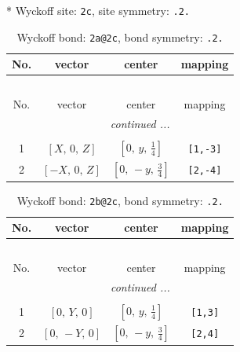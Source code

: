 \documentclass[fleqn,8pt]{jsarticle}
\begin{document}
* Wyckoff site: {\tt 2c}, site symmetry: {\tt .2.}
\renewcommand{\arraystretch}{1.2}
\begin{longtable}{cccc}
\caption{Wyckoff bond: {\tt 2a@2c}, bond symmetry: {\tt .2.}}
 \\
 \hline \hline
No. & vector & center & mapping \\ \hline \endfirsthead

\multicolumn{3}{l}{\tablename\ \thetable{}} \\
 \hline \hline
No. & vector & center & mapping \\ \hline \endhead

 \hline \hline
\multicolumn{3}{r}{\footnotesize\it continued ...} \\ \endfoot

 \hline \hline
\multicolumn{3}{r}{} \\ \endlastfoot

1 & $\left[ X,\, 0,\, Z \right]$ & $\left[ 0,\, y,\, \frac{1}{4} \right]$ & {\tt [1,-3]} \\ \hline
2 & $\left[ - X,\, 0,\, Z \right]$ & $\left[ 0,\, - y,\, \frac{3}{4} \right]$ & {\tt [2,-4]} \\
\end{longtable}
\renewcommand{\arraystretch}{1.2}
\begin{longtable}{cccc}
\caption{Wyckoff bond: {\tt 2b@2c}, bond symmetry: {\tt .2.}}
 \\
 \hline \hline
No. & vector & center & mapping \\ \hline \endfirsthead

\multicolumn{3}{l}{\tablename\ \thetable{}} \\
 \hline \hline
No. & vector & center & mapping \\ \hline \endhead

 \hline \hline
\multicolumn{3}{r}{\footnotesize\it continued ...} \\ \endfoot

 \hline \hline
\multicolumn{3}{r}{} \\ \endlastfoot

1 & $\left[ 0,\, Y,\, 0 \right]$ & $\left[ 0,\, y,\, \frac{1}{4} \right]$ & {\tt [1,3]} \\ \hline
2 & $\left[ 0,\, - Y,\, 0 \right]$ & $\left[ 0,\, - y,\, \frac{3}{4} \right]$ & {\tt [2,4]} \\
\end{longtable}
\renewcommand{\arraystretch}{1.2}
\end{document}
